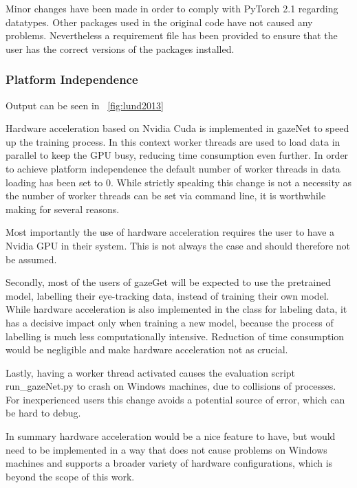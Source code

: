 \documentclass[acmlarge]{acmart}
\begin{document}
Minor changes have been made in order to comply with PyTorch 2.1 regarding datatypes. Other packages used in the original code have not caused any problems. Nevertheless a requirement file has been provided to ensure that the user has the correct versions of the packages installed.


\subsubsection{Platform Independence}
Output can be seen in ~\ref{fig:lund2013}

Hardware acceleration based on Nvidia Cuda is implemented in gazeNet to speed up the training process. In this context worker threads are used to load data in parallel to keep the GPU busy, reducing time consumption even further. In order to achieve platform independence the default number of worker threads in data loading has been set to 0. While strictly speaking this change is not a necessity as the number of worker threads can be set via command line, it is worthwhile making for several reasons.

Most importantly the use of hardware acceleration requires the user to have a Nvidia GPU in their system. This is not always the case and should therefore not be assumed.

Secondly, most of the users of gazeGet will be expected to use the pretrained model, labelling their eye-tracking data, instead of training their own model. While hardware acceleration is also implemented in the class for labeling data, it has a decisive impact only when training a new model, because the process of labelling is much less computationally intensive. Reduction of time consumption would be negligible and make hardware acceleration not as crucial.

Lastly, having a worker thread activated causes the evaluation script run\_gazeNet.py to crash on Windows machines, due to collisions of processes. For inexperienced users this change avoids a potential source of error, which can be hard to debug. %

In summary hardware acceleration would be a nice feature to have, but would need to be implemented in a way that does not cause problems on Windows machines and supports a broader variety of hardware configurations, which is beyond the scope of this work.
\end{document}
